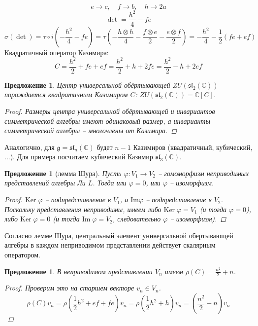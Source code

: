 \documentclass[12pt]{article}
\newtheorem{predl}[theorem]{Предложение}
\theoremstyle{definition}
\begin{document}
\begin{equation}
    e\rightarrow c,\quad f\rightarrow b,\quad h\rightarrow 2a
\end{equation}
\begin{equation}
    \det=\frac{h^2}{4}-fe
\end{equation}
\begin{equation}
    \sigma(\det)=\tau\circ i\left(-\frac{h^2}{4}-fe\right)=\tau\left(-\frac{h\otimes h}{4}-\frac{f\otimes e}{2}-\frac{e\otimes f}{2}\right)=-\frac{h^2}{4}-\frac{1}{2}(fe+ef)
\end{equation}
Квадратичный оператор Казимира:
\begin{equation}
    \boxed{C=\frac{h^2}{2}+fe+ef=\frac{h^2}{2}+h+2fe=\frac{h^2}{2}-h+2ef}
\end{equation}
\begin{predl}
    Центр универсальной обёртывающей $ZU(\mathfrak{sl}_2(\mathbb{C}))$ порождается квадратичным Казимиром $C$: $ZU(\mathfrak{sl}_2(\mathbb{C}))=\mathbb{C}[C]$.
    \begin{proof}
        Размеры центра универсальной обёртывающей и инвариантов симметрической алгебры имеют одинаковый размер, а инварианты симметрической алгебры -- многочлены от Казимира.
    \end{proof}
\end{predl}
Аналогично, для $\mathfrak{g}=\mathfrak{sl}_n(\mathbb{C})$ будет $n-1$ Казимиров (квадратичный, кубический, ...). Для примера посчитаем кубический Казимир $\mathfrak{sl}_3(\mathbb{C})$.
\begin{predl}[лемма Шура]
    Пусть $\varphi:V_1\rightarrow V_2$ -- гомоморфизм неприводимых представлений алгебры Ли $L$. Тогда или $\varphi=0$, или $\varphi$ -- изоморфизм.
    \begin{proof}
        $\text{Ker}\;\varphi$ -- подпредставление в $V_1$, а $\text{Im}\varphi$ -- подпредставление в $V_2$. Поскольку представления неприводимы, имеем либо $\text{Ker}\;\varphi=V_1$ (и тогда $\varphi=0$), либо $\text{Ker}\;\varphi=0$ (и тогда $\text{Im}\;\varphi=V_2$, следовательно $\varphi$ -- изоморфизм).
    \end{proof}
\end{predl}
Согласно лемме Шура, центральный элемент универсальной обертывающей алгебры в каждом неприводимом представлении действует скалярным оператором.
\begin{predl}
    В неприводимом представлении $V_n$ имеем $\rho(C)=\frac{n^2}{2}+n$.
    \begin{proof}
        Проверим это на старшем векторе $v_n\in V_n$.
        \begin{equation}
            \rho(C)v_n=\rho\left(\frac{1}{2}h^2+ef+fe\right)v_n=\rho\left(\frac{1}{2}h^2+h\right)v_n=\left(\frac{n^2}{2}+n\right)v_n
        \end{equation}
    \end{proof}
\end{predl}
\end{document}
